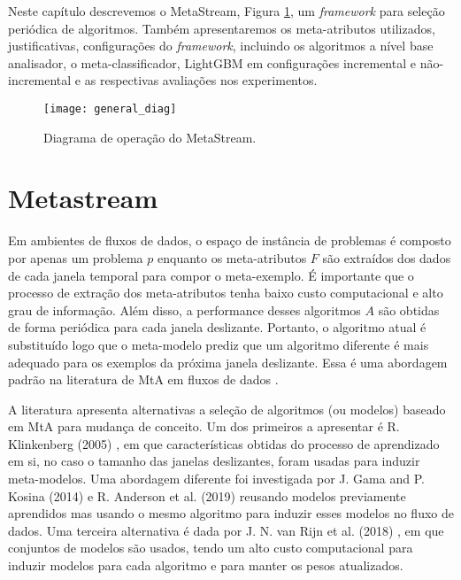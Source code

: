 \label{chap:metodologia}
Neste capítulo descrevemos o MetaStream, Figura \ref{fig:general_diag}, um \textit{framework} para seleção periódica de algoritmos. Também apresentaremos os meta-atributos utilizados, justificativas, configurações do \textit{framework}, incluindo os algoritmos a nível base analisador, o meta-classificador, LightGBM em configurações incremental e não-incremental e as respectivas avaliações nos experimentos.

\begin{figure}[ht]
    \centering
    \texttt{[image: general\_diag]}
    \caption{Diagrama de operação do MetaStream.}
    \label{fig:general_diag}
\end{figure}

\section{Metastream}
\label{sec:metastream}

Em ambientes de fluxos de dados, o espaço de instância de problemas é composto
por apenas um problema $p$ enquanto os meta-atributos $F$ são extraídos dos
dados de cada janela temporal para compor o meta-exemplo.
É importante que o processo de extração dos meta-atributos tenha baixo custo
computacional e alto grau de informação.
Além disso, a  performance desses algoritmos $A$ são obtidas de forma periódica para cada janela deslizante. Portanto, o algoritmo atual é substituído logo que o meta-modelo prediz que um
algoritmo diferente é mais adequado para os exemplos da próxima janela
deslizante. Essa é uma abordagem padrão na literatura de MtA em fluxos de dados
\cite{read2012batch, vanrijn2014algorithm, Anderson2019}.

A literatura apresenta alternativas a seleção de algoritmos (ou modelos)
baseado em MtA para mudança de conceito. Um dos primeiros a apresentar é R.
Klinkenberg (2005) \cite{klinkenberg2005}, em que características obtidas do
processo de aprendizado em si, no caso o tamanho das janelas deslizantes, foram
usadas para induzir meta-modelos.
Uma abordagem diferente foi investigada por J. Gama and P. Kosina (2014)
\cite{gama2014} e R. Anderson et al. (2019) \cite{Anderson2019}
reusando modelos previamente aprendidos mas usando o mesmo algoritmo para
induzir esses modelos no fluxo de dados. Uma terceira alternativa é dada por J.
N. van Rijn et al. (2018) \cite{VanRijn2018}, em que conjuntos de
modelos são usados, tendo um alto custo computacional para induzir modelos para cada
algoritmo e para manter os pesos atualizados.


